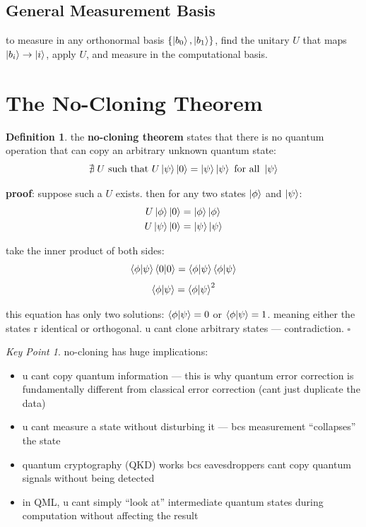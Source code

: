 \documentclass[11pt,a4paper]{article}
\theoremstyle{definition}
\newtheorem{definition}{Definition}[section]
\theoremstyle{remark}
\newtheorem*{keypoint}{Key Point}
\begin{document}
\subsection{General Measurement Basis}

to measure in any orthonormal basis $\{\ket{b_0}, \ket{b_1}\}$, find the unitary $U$ that maps $\ket{b_i} \to \ket{i}$, apply $U$, and measure in the computational basis.

\section{The No-Cloning Theorem}

\begin{definition}
the \textbf{no-cloning theorem} states that there is no quantum operation that can copy an arbitrary unknown quantum state:
\[
\nexists \; U \text{ such that } U\ket{\psi}\ket{0} = \ket{\psi}\ket{\psi} \text{ for all } \ket{\psi}
\]
\end{definition}

\textbf{proof}: suppose such a $U$ exists. then for any two states $\ket{\phi}$ and $\ket{\psi}$:
\begin{align}
U\ket{\phi}\ket{0} &= \ket{\phi}\ket{\phi} \\
U\ket{\psi}\ket{0} &= \ket{\psi}\ket{\psi}
\end{align}

take the inner product of both sides:
\[
\braket{\phi|\psi}\braket{0|0} = \braket{\phi|\psi}\braket{\phi|\psi}
\]
\[
\braket{\phi|\psi} = \braket{\phi|\psi}^2
\]

this equation has only two solutions: $\braket{\phi|\psi} = 0$ or $\braket{\phi|\psi} = 1$. meaning either the states r identical or orthogonal. u cant clone arbitrary states --- contradiction. $\square$

\begin{keypoint}
no-cloning has huge implications:
\begin{itemize}
    \item u cant copy quantum information --- this is why quantum error correction is fundamentally different from classical error correction (cant just duplicate the data)
    \item u cant measure a state without disturbing it --- bcs measurement ``collapses'' the state
    \item quantum cryptography (QKD) works bcs eavesdroppers cant copy quantum signals without being detected
    \item in QML, u cant simply ``look at'' intermediate quantum states during computation without affecting the result
\end{itemize}
\end{keypoint}
\end{document}
